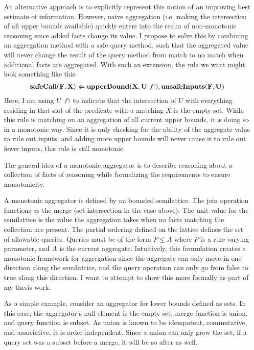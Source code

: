 An alternative approach is to explicitly represent this notion of an improving best estimate of information.
However, naive aggregation (i.e. making the intersection of all upper bounds available) quickly enters into the realm of non-monotonic reasoning since added facts change its value.
I propose to solve this by combining an aggregation method with a safe query method, such that the aggregated value will never change the result of the query method from match to no match when additional facts are aggregated.
With such an extension, the rule we want might look something like this:
\begin{gather*}
        {\bf safeCall}({\bf F}, {\bf X}) \Leftarrow {\bf upperBound}({\bf X}, {\bf U} \not \cap), {\bf unsafeInputs}({\bf F}, {\bf U})
\end{gather*}
Here, I am using $U \not \cap$ to indicate that the intersection of $U$ with everything residing in that slot of the predicate with a matching $X$ is the empty set.
While this rule is matching on an aggregation of all current upper bounds, it is doing so in a monotonic way.
Since it is only checking for the ability of the aggregate value to rule out inputs, and adding more upper bounds will never cause it to rule out fewer inputs, this rule is still monotonic.

The general idea of a monotonic aggregator is to describe reasoning about a collection of facts of reasoning while formalizing the requirements to ensure monotonicity.

A monotonic aggregator is defined by an bounded semilattice.
The join operation functions as the merge (set intersection in the case above).
The unit value for the semilattice is the value the aggregation takes when no facts matching the collection are present.
The partial ordering defined on the lattice defines the set of allowable queries.
Queries must be of the form $P \leq A$ where $P$ is a rule varying parameter, and $A$ is the current aggregate.
Intuitively, this formulation creates a monotonic framework for aggregation since the aggregate can only move in one direction along the semilattice, and the query operation can only go from false to true along this direction.
I want to attempt to show this more formally as part of my thesis work.

As a simple example, consider an aggregator for lower bounds defined as sets.
In this case, the aggregator's null element is the empty set, merge function is union, and query function is subset.
As union is known to be idempotent, commutative, and associative, it is order independent.
Since a union can only grow the set, if a query set was a subset before a merge, it will be so after as well.

